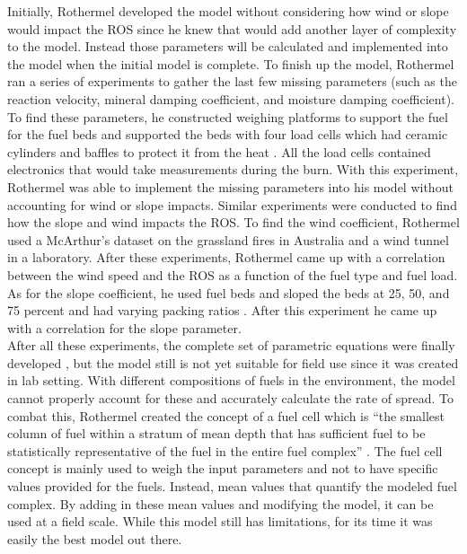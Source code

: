 \documentclass{article}
\begin{document}
\indent Initially, Rothermel developed the model without considering how wind or slope would impact the ROS since he knew that would add another layer of complexity to the model. Instead those parameters will be calculated and implemented into the model when the initial model is complete. To finish up the model, Rothermel ran a series of experiments to gather the last few missing parameters (such as the reaction velocity, mineral damping coefficient, and moisture damping coefficient). To find these parameters, he constructed weighing platforms to support the fuel for the fuel beds and supported the beds with four load cells which had ceramic cylinders and baffles to protect it from the heat \citep{Rothermel1972}. All the load cells contained electronics that would take measurements during the burn. With this experiment, Rothermel was able to implement the missing parameters into his model without accounting for wind or slope impacts. Similar experiments were conducted to find how the slope and wind impacts the ROS. To find the wind coefficient, Rothermel used a McArthur’s dataset on the grassland fires in Australia and a wind tunnel in a laboratory. After these experiments, Rothermel came up with a correlation between the wind speed and the ROS as a function of the fuel type and fuel load. As for the slope coefficient, he used fuel beds and sloped the beds at 25, 50, and 75 percent and had varying packing ratios \citep{Rothermel1972}. After this experiment he came up with a correlation for the slope parameter. \\
\indent After all these experiments, the complete set of parametric equations were finally developed \citep{Rothermel1972}, but the model still is not yet suitable for field use since it was created in lab setting. With different compositions of fuels in the environment, the model cannot properly account for these and accurately calculate the rate of spread. To combat this, Rothermel created the concept of a fuel cell which is “the smallest column of fuel within a stratum of mean depth that has sufficient fuel to be statistically representative of the fuel in the entire fuel complex” \citep{Rothermel1972}. The fuel cell concept is mainly used to weigh the input parameters and not to have specific values provided for the fuels. Instead, mean values that quantify the modeled fuel complex. By adding in these mean values and modifying the model, it can be used at a field scale. While this model still has limitations, for its time it was easily the best model out there. \\
\end{document}
